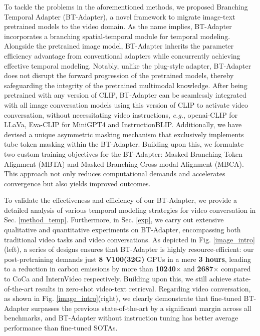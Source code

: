 \documentclass{article} \usepackage{iclr2024_conference,times}
\begin{document}
To tackle the problems in the aforementioned methods, we proposed Branching Temporal Adapter (BT-Adapter), a novel framework to migrate image-text pretrained models to the video domain. As the name implies, BT-Adapter incorporates a branching spatial-temporal module for temporal modeling. Alongside the pretrained image model, BT-Adapter inherits the parameter efficiency advantage from conventional adapters \citep{houlsby2019parameter} while concurrently achieving effective temporal modeling. Notably, unlike the plug-style adapter, BT-Adapter does not disrupt the forward progression of the pretrained models, thereby safeguarding the integrity of the pretrained multimodal knowledge. After being pretrained with any version of CLIP, BT-Adapter can be seamlessly integrated with all image conversation models using this version of CLIP to activate video conversation, without necessitating video instructions, \textit{e.g.}, openai-CLIP for LLaVa, Eva-CLIP for MiniGPT4 and InstructionBLIP. Additionally, we have devised a unique asymmetric masking mechanism that exclusively implements tube token masking within the BT-Adapter. Building upon this, we formulate two custom training objectives for the BT-Adapter: Masked Branching Token Alignment (MBTA) and Masked Branching Cross-modal Alignment (MBCA). This approach not only reduces computational demands and accelerates convergence but also yields improved outcomes.

To validate the effectiveness and efficiency of our BT-Adapter, we provide a detailed analysis of various temporal modeling strategies for video conversation in Sec. \ref{method_temp}. Furthermore, in Sec. \ref{exp}, we carry out extensive qualitative and quantitative experiments on BT-Adapter, encompassing both traditional video tasks and video conversations.
As depicted in Fig. \ref{image_intro}(left), a series of designs ensures that BT-Adapter is highly resource-efficient: our post-pretraining demands just \textbf{8 V100(32G)} GPUs in a mere \textbf{3 hours}, leading to a reduction in carbon emissions by more than \textbf{10240$\times$} and \textbf{2687$\times$} compared to CoCa \citep{yu2022coca} and InternVideo \citep{wang2022internvideo} respectively. Building upon this, we still achieve state-of-the-art results in zero-shot video-text retrieval. Regarding video conversation, as shown in Fig. \ref{image_intro}(right), we clearly demonstrate that fine-tuned BT-Adapter surpasses the previous state-of-the-art by a significant margin across all benchmarks, and BT-Adapter without instruction tuning has better average performance than fine-tuned SOTAs. 
\end{document}
